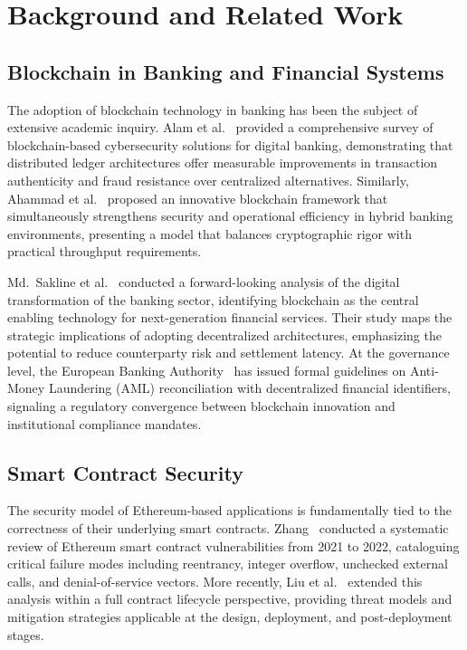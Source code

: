 \documentclass[conference]{IEEEtran}
\begin{document}
\section{Background and Related Work}
\label{sec:related}

\subsection{Blockchain in Banking and Financial Systems}

The adoption of blockchain technology in banking has been the subject of
extensive academic inquiry. Alam et al.~\cite{ref1} provided a comprehensive
survey of blockchain-based cybersecurity solutions for digital banking,
demonstrating that distributed ledger architectures offer measurable
improvements in transaction authenticity and fraud resistance over centralized
alternatives. Similarly, Ahammad et al.~\cite{ref6} proposed an innovative
blockchain framework that simultaneously strengthens security and operational
efficiency in hybrid banking environments, presenting a model that balances
cryptographic rigor with practical throughput requirements.

Md.~Sakline et al.~\cite{ref8} conducted a forward-looking analysis of the
digital transformation of the banking sector, identifying blockchain as the
central enabling technology for next-generation financial services. Their study
maps the strategic implications of adopting decentralized architectures,
emphasizing the potential to reduce counterparty risk and settlement latency.
At the governance level, the European Banking Authority~\cite{ref5} has issued
formal guidelines on Anti-Money Laundering (AML) reconciliation with
decentralized financial identifiers, signaling a regulatory convergence between
blockchain innovation and institutional compliance mandates.

\subsection{Smart Contract Security}

The security model of Ethereum-based applications is fundamentally tied to the
correctness of their underlying smart contracts. Zhang~\cite{ref15} conducted a
systematic review of Ethereum smart contract vulnerabilities from 2021 to 2022,
cataloguing critical failure modes including reentrancy, integer overflow,
unchecked external calls, and denial-of-service vectors. More recently, Liu
et al.~\cite{ref19} extended this analysis within a full contract lifecycle
perspective, providing threat models and mitigation strategies applicable at the
design, deployment, and post-deployment stages.
\end{document}
